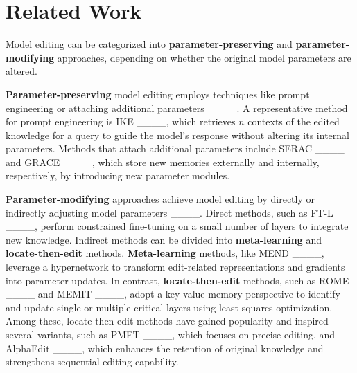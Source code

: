 \section{Related Work}
\label{relatedwork}
Model editing can be categorized into \textbf{parameter-preserving} and \textbf{parameter-modifying} approaches, depending on whether the original model parameters are altered.

\textbf{Parameter-preserving} model editing employs techniques like prompt engineering or attaching additional parameters ____. A representative method for prompt engineering is IKE ____, which retrieves $n$ contexts of the edited knowledge for a query to guide the model's response without altering its internal parameters. Methods that attach additional parameters include SERAC ____ and GRACE ____, which store new memories externally and internally, respectively, by introducing new parameter modules.

\textbf{Parameter-modifying} approaches achieve model editing by directly or indirectly adjusting model parameters ____. Direct methods, such as FT-L ____, perform constrained fine-tuning on a small number of layers to integrate new knowledge. Indirect methods can be divided into \textbf{meta-learning} and \textbf{locate-then-edit} methods. \textbf{Meta-learning} methods, like MEND ____, leverage a hypernetwork to transform edit-related representations and gradients into parameter updates. In contrast, \textbf{locate-then-edit} methods, such as ROME ____ and MEMIT ____, adopt a key-value memory perspective to identify and update single or multiple critical layers using least-squares optimization. Among these, locate-then-edit methods have gained popularity and inspired several variants, such as PMET ____, which focuses on precise editing, and AlphaEdit ____, which enhances the retention of original knowledge and strengthens sequential editing capability.